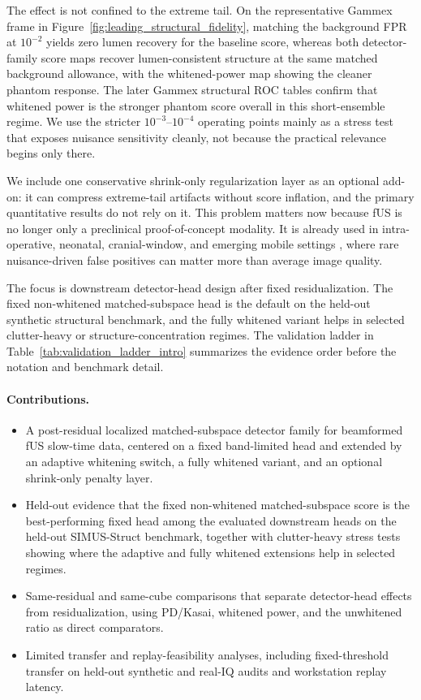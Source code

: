 \documentclass[11pt]{article}
\begin{document}
The effect is not confined to the extreme tail. On the representative Gammex frame in Figure~\ref{fig:leading_structural_fidelity}, matching the background FPR at $10^{-2}$ yields zero lumen recovery for the baseline score, whereas both detector-family score maps recover lumen-consistent structure at the same matched background allowance, with the whitened-power map showing the cleaner phantom response. The later Gammex structural ROC tables confirm that whitened power is the stronger phantom score overall in this short-ensemble regime. We use the stricter $10^{-3}$--$10^{-4}$ operating points mainly as a stress test that exposes nuisance sensitivity cleanly, not because the practical relevance begins only there.

We include one conservative shrink-only regularization layer as an optional add-on: it can compress extreme-tail artifacts without score inflation, and the primary quantitative results do not rely on it. This problem matters now because fUS is no longer only a preclinical proof-of-concept modality. It is already used in intra-operative, neonatal, cranial-window, and emerging mobile settings \cite{Imbault2017,DemeneHumanNewborn2017,BarangerNeonates2021,Rabut2024,MobileFUS2025,Deffieux2021}, where rare nuisance-driven false positives can matter more than average image quality.

The focus is downstream detector-head design after fixed residualization. The fixed non-whitened matched-subspace head is the default on the held-out synthetic structural benchmark, and the fully whitened variant helps in selected clutter-heavy or structure-concentration regimes. The validation ladder in Table~\ref{tab:validation_ladder_intro} summarizes the evidence order before the notation and benchmark detail.

\paragraph{Contributions.}
\begin{itemize}[nosep]
  \item A post-residual localized matched-subspace detector family for beamformed fUS slow-time data, centered on a fixed band-limited head and extended by an adaptive whitening switch, a fully whitened variant, and an optional shrink-only penalty layer.
  \item Held-out evidence that the fixed non-whitened matched-subspace score is the best-performing fixed head among the evaluated downstream heads on the held-out SIMUS-Struct benchmark, together with clutter-heavy stress tests showing where the adaptive and fully whitened extensions help in selected regimes.
  \item Same-residual and same-cube comparisons that separate detector-head effects from residualization, using PD/Kasai, whitened power, and the unwhitened ratio as direct comparators.
  \item Limited transfer and replay-feasibility analyses, including fixed-threshold transfer on held-out synthetic and real-IQ audits and workstation replay latency.
\end{itemize}
\end{document}
